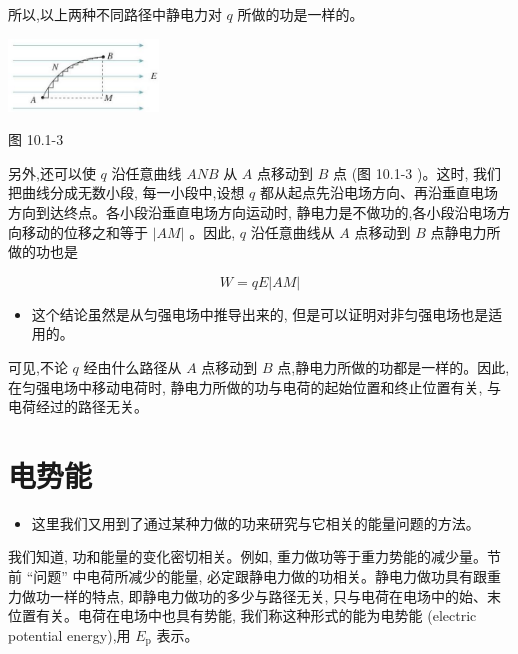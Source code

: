 \documentclass[10pt]{article}
\begin{document}
所以,以上两种不同路径中静电力对 \(q\) 所做的功是一样的。

\begin{center}
\includegraphics[max width=0.3\textwidth]{images/01911d5f-8e38-70c0-b5b8-2b399bd115b6_32_348396.jpg}
\end{center}

图 10.1-3

另外,还可以使 \(q\) 沿任意曲线 \({ANB}\) 从 \(A\) 点移动到 \(B\) 点 (图 10.1-3 )。这时, 我们把曲线分成无数小段, 每一小段中,设想 \(q\) 都从起点先沿电场方向、再沿垂直电场方向到达终点。各小段沿垂直电场方向运动时, 静电力是不做功的,各小段沿电场方向移动的位移之和等于 \(\left| {AM}\right|\) 。因此, \(q\) 沿任意曲线从 \(A\) 点移动到 \(B\) 点静电力所做的功也是

\[
W = {qE}\left| {AM}\right|
\]

\begin{mdframed}

\begin{itemize}
\item 这个结论虽然是从匀强电场中推导出来的, 但是可以证明对非匀强电场也是适用的。
\end{itemize}

\end{mdframed}

可见,不论 \(q\) 经由什么路径从 \(A\) 点移动到 \(B\) 点,静电力所做的功都是一样的。因此, 在匀强电场中移动电荷时, 静电力所做的功与电荷的起始位置和终止位置有关, 与电荷经过的路径无关。

\section*{电势能}

\begin{mdframed}

\begin{itemize}
\item 这里我们又用到了通过某种力做的功来研究与它相关的能量问题的方法。
\end{itemize}

\end{mdframed}

我们知道, 功和能量的变化密切相关。例如, 重力做功等于重力势能的减少量。节前 “问题” 中电荷所减少的能量, 必定跟静电力做的功相关。静电力做功具有跟重力做功一样的特点, 即静电力做功的多少与路径无关, 只与电荷在电场中的始、末位置有关。电荷在电场中也具有势能, 我们称这种形式的能为电势能 (electric potential energy),用 \({E}_{\mathrm{p}}\) 表示。
\end{document}
